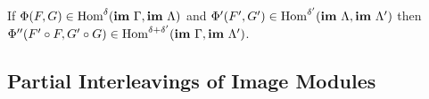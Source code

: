 \begin{lemma}\label{lem:composition}
  If $\Phi(F, G)\in\mathrm{Hom}^\delta(\mathbf{im}~\Gamma, \mathbf{im}~\Lambda)$ and $\Phi'(F', G')\in\mathrm{Hom}^{\delta'}(\mathbf{im}~\Lambda, \mathbf{im}~\Lambda')$ then $\Phi''(F'\circ F, G'\circ G)\in\mathrm{Hom}^{\delta+\delta'}(\mathbf{im}~\Gamma,\mathbf{im}~\Lambda')$.
\end{lemma}
%

\subsection{Partial Interleavings of Image Modules}





